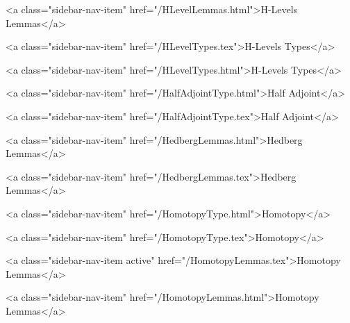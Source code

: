       
        
          <a class="sidebar-nav-item" href="/HLevelLemmas.html">H-Levels Lemmas</a>
        
      
    
      
        
          <a class="sidebar-nav-item" href="/HLevelTypes.tex">H-Levels Types</a>
        
      
    
      
        
          <a class="sidebar-nav-item" href="/HLevelTypes.html">H-Levels Types</a>
        
      
    
      
        
          <a class="sidebar-nav-item" href="/HalfAdjointType.html">Half Adjoint</a>
        
      
    
      
        
          <a class="sidebar-nav-item" href="/HalfAdjointType.tex">Half Adjoint</a>
        
      
    
      
        
          <a class="sidebar-nav-item" href="/HedbergLemmas.html">Hedberg Lemmas</a>
        
      
    
      
        
          <a class="sidebar-nav-item" href="/HedbergLemmas.tex">Hedberg Lemmas</a>
        
      
    
      
        
          <a class="sidebar-nav-item" href="/HomotopyType.html">Homotopy</a>
        
      
    
      
        
          <a class="sidebar-nav-item" href="/HomotopyType.tex">Homotopy</a>
        
      
    
      
        
          <a class="sidebar-nav-item active" href="/HomotopyLemmas.tex">Homotopy Lemmas</a>
        
      
    
      
        
          <a class="sidebar-nav-item" href="/HomotopyLemmas.html">Homotopy Lemmas</a>
        
      
    
